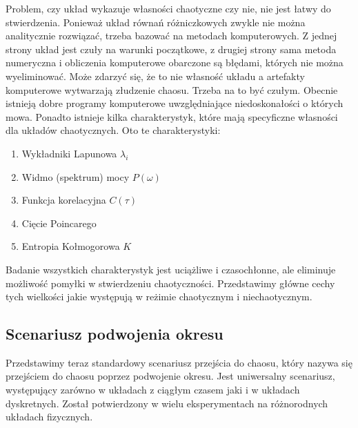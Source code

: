 \documentclass[a4paper,12pt,polish]{sphinxmanual}
\begin{document}
Problem, czy układ wykazuje własności chaotyczne czy nie, nie jest łatwy do stwierdzenia. Ponieważ układ równań różniczkowych zwykle nie można analitycznie rozwiązać, trzeba bazować na metodach komputerowych. Z jednej strony układ jest czuły na warunki początkowe, z drugiej strony sama metoda numeryczna i obliczenia komputerowe obarczone są błędami, których nie można wyeliminować. Może zdarzyć się, że to nie własność  układu a artefakty komputerowe wytwarzają złudzenie  chaosu. Trzeba na to być czułym. Obecnie istnieją dobre programy komputerowe uwzględniające niedoskonałości o których mowa. Ponadto istnieje kilka charakterystyk,  które mają specyficzne własności  dla układów chaotycznych.  Oto te charakterystyki:
\begin{enumerate}
\item {} 
Wykładniki Lapunowa $\lambda_i$

\item {} 
Widmo (spektrum) mocy $P(\omega)$

\item {} 
Funkcja korelacyjna  $C(\tau)$

\item {} 
Cięcie Poincarego

\item {} 
Entropia Kołmogorowa $K$

\end{enumerate}

Badanie wszystkich  charakterystyk jest uciążliwe i czasochłonne, ale eliminuje możliwość pomyłki w stwierdzeniu  chaotyczności. Przedstawimy główne cechy  tych wielkości jakie występują w reżimie chaotycznym i niechaotycznym.


\subsection{Scenariusz podwojenia okresu}
\label{ch2/chII012:scenariusz-podwojenia-okresu}
Przedstawimy teraz standardowy scenariusz przejścia do chaosu, który nazywa się przejściem do chaosu poprzez podwojenie okresu. Jest uniwersalny scenariusz, występujący zarówno w układach z ciągłym czasem jaki i w układach dyskretnych. Został potwierdzony w wielu eksperymentach na różnorodnych układach fizycznych.
\end{document}
